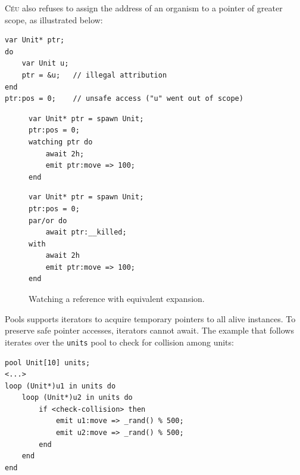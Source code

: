 \documentclass{acm_proc_article-sp}
\newcommand{\CEU}{\textsc{C\'{e}u}\xspace}
\newcommand{\code}[1] {{\small{\texttt{#1}}}}
\newcommand{\1}{\;}
\newcommand{\2}{\;\;}
\newcommand{\3}{\;\;\;}
\newcommand{\5}{\;\;\;\;\;}
\begin{document}
\CEU also refuses to assign the address of an organism to a pointer of greater 
scope, as illustrated below:

\begin{lstlisting}
var Unit* ptr;
do
    var Unit u;
    ptr = &u;   // illegal attribution
end
ptr:pos = 0;    // unsafe access ("u" went out of scope)
\end{lstlisting}

\begin{figure}[t]
\begin{minipage}[t]{0.48\linewidth}
\begin{lstlisting}
var Unit* ptr = spawn Unit;
ptr:pos = 0;
watching ptr do
    await 2h;
    emit ptr:move => 100;
end
\end{lstlisting}
\end{minipage}
%
\begin{minipage}[t]{0.48\linewidth}
\begin{lstlisting}
var Unit* ptr = spawn Unit;
ptr:pos = 0;
par/or do
    await ptr:__killed;
with
    await 2h
    emit ptr:move => 100;
end
\end{lstlisting}
\end{minipage}
\caption{ Watching a reference with equivalent expansion.
\label{lst.watching}
}
\end{figure}

Pools supports iterators to acquire temporary pointers to all alive instances.
To preserve safe pointer accesses, iterators cannot await.
The example that follows iterates over the \code{units} pool to check for 
collision among units:


\begin{lstlisting}
pool Unit[10] units;
<...>
loop (Unit*)u1 in units do
    loop (Unit*)u2 in units do
        if <check-collision> then
            emit u1:move => _rand() % 500;
            emit u2:move => _rand() % 500;
        end
    end
end
\end{lstlisting}
\end{document}
